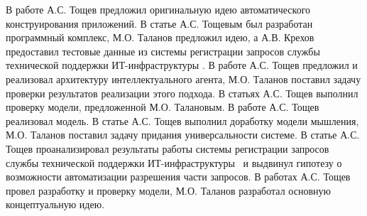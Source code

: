 В работе  \cite{Lobachevskii} А.С. Тощев предложил оригинальную идею автоматического конструирования приложений. В статье \cite{WCIT-2012} А.С. Тощевым был разработан программный комплекс, М.О. Таланов предложил идею, а А.В. Крехов предоставил тестовые данные из системы регистрации запросов службы технической поддержки ИТ-инфраструктуры \icl. В работе \cite{ISGZ} А.С. Тощев предложил и реализовал архитектуру интеллектуального агента, М.О. Таланов поставил задачу проверки результатов реализации этого подхода. В статьях \cite{IJSE-1, IJSE-2} А.С. Тощев выполнил проверку модели, предложенной М.О. Талановым. В работе \cite{RCDL-2014} А.С. Тощев реализовал модель. В статье \cite{ AMSTA-2015} А.С. Тощев выполнил доработку модели мышления, М.О. Таланов поставил задачу придания универсальности системе. В статье \cite{VAK-1} А.С. Тощев проанализировал результаты работы системы регистрации запросов службы технической поддержки ИТ-инфраструктуры \icl\ и выдвинул гипотезу о возможности автоматизации разрешения части запросов. В работах \cite{EB-1, EB-2} А.С. Тощев провел разработку и проверку модели, М.О. Таланов разработал основную концептуальную идею. \par


